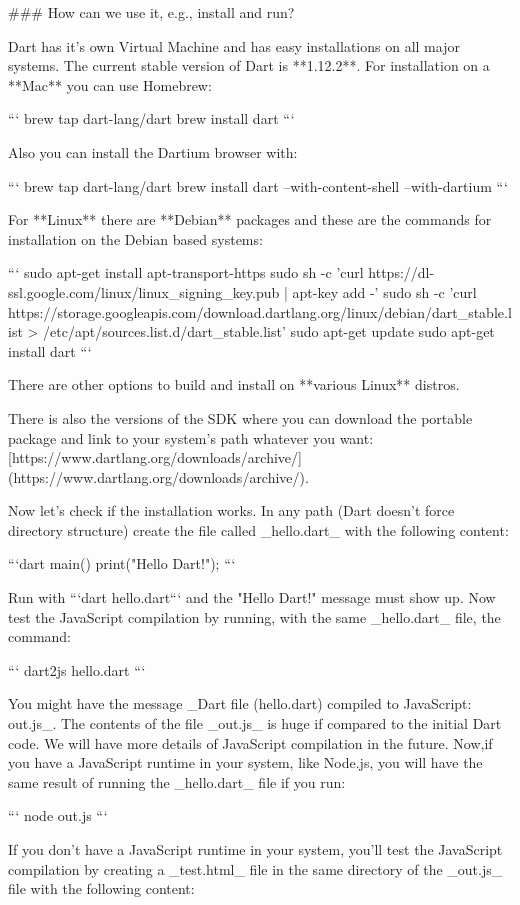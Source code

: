 ### How can we use it, e.g., install and run?

Dart has it's own Virtual Machine and has easy installations on all major
systems. The current stable version of Dart is **1.12.2**. For installation on a
**Mac** you can use Homebrew:

```
brew tap dart-lang/dart
brew install dart
```

Also you can install the Dartium browser with:

```
brew tap dart-lang/dart
brew install dart --with-content-shell --with-dartium
```

For **Linux** there are **Debian** packages and these are the commands for
installation on the Debian based systems:

```
sudo apt-get install apt-transport-https
sudo sh -c 'curl https://dl-ssl.google.com/linux/linux_signing_key.pub | apt-key add -'
sudo sh -c 'curl https://storage.googleapis.com/download.dartlang.org/linux/debian/dart_stable.list > /etc/apt/sources.list.d/dart_stable.list'
sudo apt-get update
sudo apt-get install dart
```

There are other options to build and install on **various Linux** distros\cite{3_12}.

There is also the versions of the SDK where you can download the portable
package and link to your system's path whatever you want:
[https://www.dartlang.org/downloads/archive/](https://www.dartlang.org/downloads/archive/).

Now let's check if the installation works. In any path (Dart doesn't force
directory structure) create the file called _hello.dart_ with the following
content:

```dart
main() {
  print("Hello Dart!");
}
```

Run with ```dart hello.dart``` and the "Hello Dart!" message must show up. Now
test the JavaScript compilation by running, with the same _hello.dart_ file, the
command:

```
dart2js hello.dart
```

You might have the message _Dart file (hello.dart) compiled to JavaScript:
out.js_. The contents of the file _out.js_ is huge if compared to the initial
Dart code. We will have more details of JavaScript compilation in the future.
Now,if you have a JavaScript runtime in your system, like Node.js, you will have
the same result of running the _hello.dart_ file if you run:

```
node out.js
```

If you don't have a JavaScript runtime in your system, you'll test the
JavaScript compilation by creating a _test.html_ file in the same directory
of the _out.js_ file with the following content:

